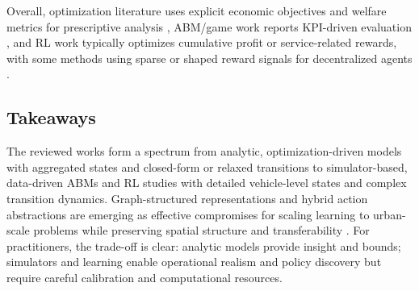 Overall, optimization literature uses explicit economic objectives and welfare metrics for prescriptive analysis \citep{spatiotemporal_pricing,geometric_matching,spatial_pricing}, ABM/game work reports KPI-driven evaluation \citep{competition_and_cooperation,modeling_the_competition}, and RL work typically optimizes cumulative profit or service-related rewards, with some methods using sparse or shaped reward signals for decentralized agents \citep{competitive_pricing,learning_based,samod,two_sided}.

\subsection{Takeaways}
The reviewed works form a spectrum from analytic, optimization-driven models with aggregated states and closed-form or relaxed transitions to simulator-based, data-driven ABMs and RL studies with detailed vehicle-level states and complex transition dynamics. Graph-structured representations and hybrid action abstractions are emerging as effective compromises for scaling learning to urban-scale problems while preserving spatial structure and transferability \citep{graph_meta,learning_based,competitive_pricing}. For practitioners, the trade-off is clear: analytic models provide insight and bounds; simulators and learning enable operational realism and policy discovery but require careful calibration and computational resources.

